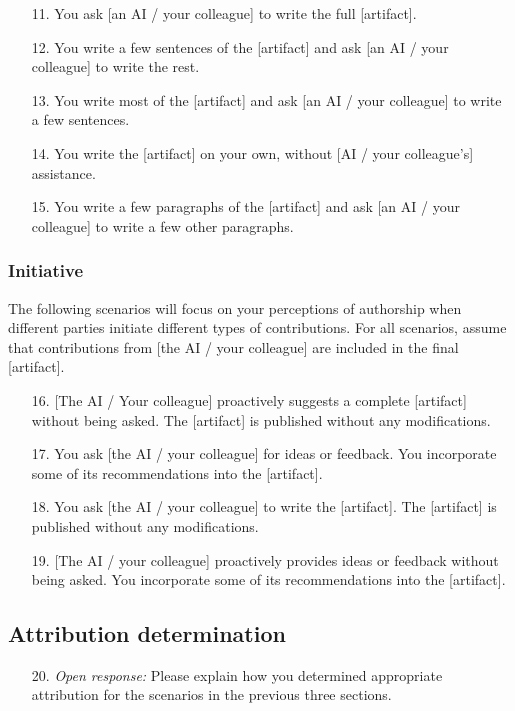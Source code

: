 \begin{itemize}[leftmargin=0pt, itemindent=2em]
    \item[11.] You ask [an AI / your colleague] to write the full [artifact].
    \item[12.] You write a few sentences of the [artifact] and ask [an AI / your colleague] to write the rest.
    \item[13.] You write most of the [artifact] and ask [an AI / your colleague] to write a few sentences.
    \item[14.] You write the [artifact] on your own, without [AI / your colleague's] assistance.
    \item[15.] You write a few paragraphs of the [artifact] and ask [an AI / your colleague] to write a few other paragraphs.
\end{itemize}

\subsubsection{Initiative}
The following scenarios will focus on your perceptions of authorship when different parties initiate different types of contributions. For all scenarios, assume that contributions from [the AI / your colleague] are included in the final [artifact].

\begin{itemize}[leftmargin=0pt, itemindent=2em]
    \item[16.] {[The AI / Your colleague]} proactively suggests a complete [artifact] without being asked. The [artifact] is published without any modifications.
    \item[17.] You ask [the AI / your colleague] for ideas or feedback. You incorporate some of its recommendations into the [artifact].
    \item[18.] You ask [the AI / your colleague] to write the [artifact]. The [artifact] is published without any modifications.
    \item[19.] {[The AI / your colleague]} proactively provides ideas or feedback without being asked. You incorporate some of its recommendations into the [artifact].
\end{itemize}

\subsection{Attribution determination}

\begin{itemize}[leftmargin=0pt, itemindent=2em]
    \item[20.] \textit{Open response:} Please explain how you determined appropriate attribution for the scenarios in the previous three sections.
\end{itemize}

